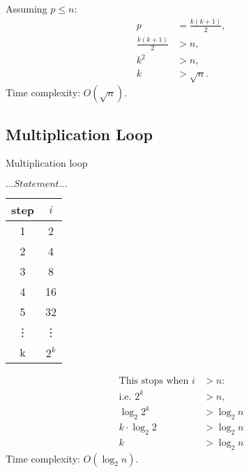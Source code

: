 \documentclass[twoside]{article}
\begin{document}
Assuming $p \leq n$:
\[
\begin{aligned}
    p &= \frac{k(k+1)}{2}, \\
    \frac{k(k+1)}{2} &> n, \\
    k^2 &> n, \\
    k &> \sqrt{n}.
\end{aligned}
\]
Time complexity: $O(\sqrt{n})$.

\subsection{Multiplication Loop}
\begin{algorithm}[H]
    \caption{Multiplication loop}\label{simple_for6}
    \begin{algorithmic}
            \State$...Statement...$
        \EndFor
    \end{algorithmic}
\end{algorithm}

\begin{table}[H]
    \centering
    \begin{tabular}{|c|c|}
        \hline
        step & $i$\\
        \hline
        1 & 2\\
        2 & 4\\
        3 & 8\\
        4 & 16\\
        5 & 32\\
        \vdots & \vdots\\
        k & $2^k$\\
        \hline
    \end{tabular}
\end{table}
\[
\begin{aligned}
    \text{This stops when } i &> n: \\
    \text{i.e.  } 2^k &> n, \\
    \log_2{2^k} &> \log_2{n}\\
    k \cdot \log_2{2} &> \log_2{n}\\
    k &> \log_2{n}
\end{aligned}
\]
Time complexity: $O(\log_2{n})$.
\end{document}
